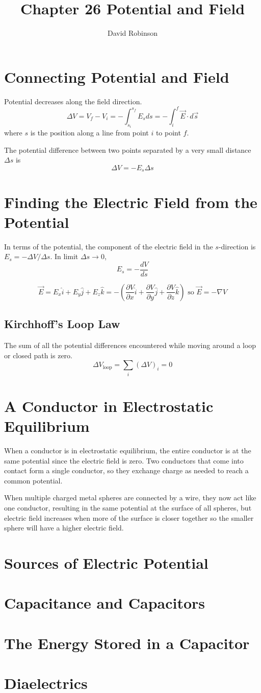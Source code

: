 \documentclass{article}
\title{Chapter 26 Potential and Field}
\author{David Robinson}
\date{}
\begin{document}
\maketitle

\section*{Connecting Potential and Field}
Potential decreases along the field direction.
\[\Delta V=V_f - V_i = -\int_{s_i}^{s_f} E_s ds=-\int_i^f \vec{E}\cdot d\vec{s}\] where $s$ is the position along a line from point $i$ to point $f$.
\newline

The potential difference between two points separated by a very small distance $\Delta s$ is
\[\Delta V=-E_s \Delta s\]

\section*{Finding the Electric Field from the Potential}

In terms of the potential, the component of the electric field in the $s$-direction is $E_s = -\Delta V / \Delta s$. In limit $\Delta s\rightarrow 0$,
\[E_s = -\frac{dV}{ds}\]

\[\vec{E}=E_x\hat{i} + E_y\hat{j} + E_z\hat{k}=-(\frac{\partial V}{\partial x}\hat{i}+\frac{\partial V}{\partial y}\hat{j}+\frac{\partial V}{\partial z}\hat{k})\text{ so }\vec{E}=-\nabla V\]

\subsection*{Kirchhoff's Loop Law}
The sum of all the potential differences encountered while moving around a loop or closed path is zero.
\[\Delta V_\text{loop}=\sum_i (\Delta V)_i=0\]
\section*{A Conductor in Electrostatic Equilibrium}

When a conductor is in electrostatic equilibrium, the entire conductor is at the same potential since the electric field is zero. Two conductors that come into contact form a single conductor, so they exchange charge as needed to reach a common potential.
\newline

When multiple charged metal spheres are connected by a wire, they now act like one conductor, resulting in the same potential at the surface of all spheres, but electric field increases when more of the surface is closer together so the smaller sphere will have a higher electric field.
\section*{Sources of Electric Potential}
\section*{Capacitance and Capacitors}
\section*{The Energy Stored in a Capacitor}
\section*{Diaelectrics}
\end{document}

